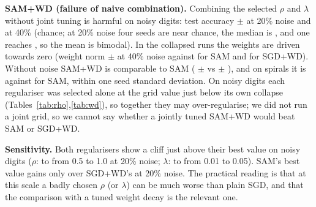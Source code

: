 \textbf{SAM+WD (failure of naive combination).} Combining the selected $\rho$ and $\lambda$ without joint tuning is harmful on noisy digits: test accuracy  $\pm$  at 20\% noise and  at 40\% (chance; at 20\% noise four seeds are near chance, the median is , and one reaches , so the mean is bimodal). In the collapsed runs the weights are driven towards zero (weight norm  $\pm$  at 40\% noise against  for SAM and  for SGD+WD). Without noise SAM+WD is comparable to SAM ( $\pm$  vs  $\pm$ ), and on spirals it is  against  for SAM, within one seed standard deviation. On noisy digits each regulariser was selected alone at the grid value just below its own collapse (Tables~\ref{tab:rho},\ref{tab:wd}), so together they may over-regularise; we did not run a joint grid, so we cannot say whether a jointly tuned SAM+WD would beat SAM or SGD+WD.

\textbf{Sensitivity.} Both regularisers show a cliff just above their best value on noisy digits ($\rho$:  to  from 0.5 to 1.0 at 20\% noise; $\lambda$:  to  from 0.01 to 0.05). SAM's best value gains only  over SGD+WD's at 20\% noise. The practical reading is that at this scale a badly chosen $\rho$ (or $\lambda$) can be much worse than plain SGD, and that the comparison with a tuned weight decay is the relevant one.
